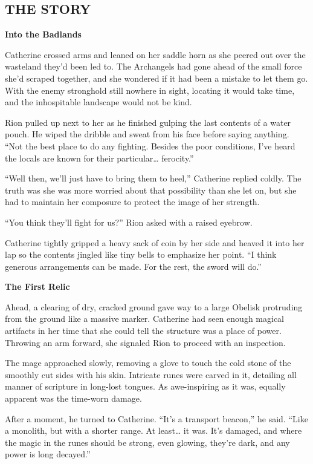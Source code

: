 \begin{multicols*}{2}

\subsection*{\MakeUppercase{The story}}

\textbf{Into the Badlands}

Catherine crossed arms and leaned on her saddle horn as she peered out over the wasteland they'd been led to.
The Archangels had gone ahead of the small force she'd scraped together, and she wondered if it had been a mistake to let them go.
With the enemy stronghold still nowhere in sight, locating it would take time, and the inhospitable landscape would not be kind.

Rion pulled up next to her as he finished gulping the last contents of a water pouch.
He wiped the dribble and sweat from his face before saying anything.
``Not the best place to do any fighting.
Besides the poor conditions, I've heard the locals are known for their particular… ferocity.''

``Well then, we'll just have to bring them to heel,'' Catherine replied coldly.
The truth was she was more worried about that possibility than she let on, but she had to maintain her composure to protect the image of her strength.

``You think they'll fight for us?'' Rion asked with a raised eyebrow.

Catherine tightly gripped a heavy sack of coin by her side and heaved it into her lap so the contents jingled like tiny bells to emphasize her point.
``I think generous arrangements can be made.
For the rest, the sword will do.''

\textbf{The First Relic}

Ahead, a clearing of dry, cracked ground gave way to a large Obelisk protruding from the ground like a massive marker.
Catherine had seen enough magical artifacts in her time that she could tell the structure was a place of power.
Throwing an arm forward, she signaled Rion to proceed with an inspection.

The mage approached slowly, removing a glove to touch the cold stone of the smoothly cut sides with his skin.
Intricate runes were carved in it, detailing all manner of scripture in long-lost tongues.
As awe-inspiring as it was, equally apparent was the time-worn damage.

After a moment, he turned to Catherine.
``It's a transport beacon,'' he said.
``Like a monolith, but with a shorter range.
At least… it was.
It's damaged, and where the magic in the runes should be strong, even glowing, they're dark, and any power is long decayed.''


\end{multicols*}
